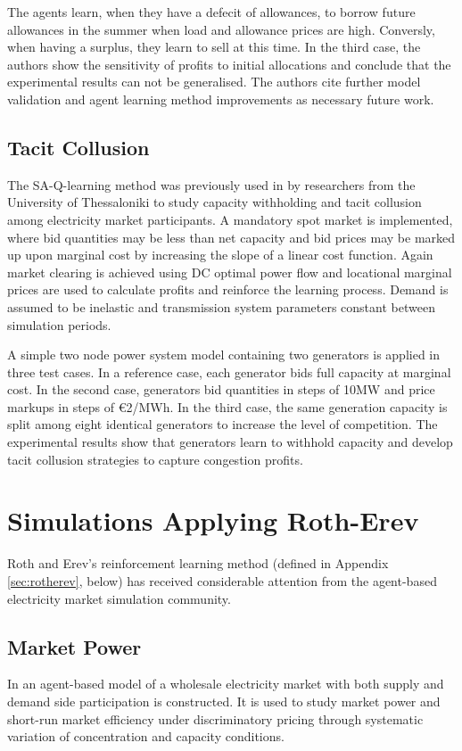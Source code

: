 The agents learn, when they have a defecit of allowances, to borrow future
allowances in the summer when load and allowance prices are high.  Conversly,
when having a surplus, they learn to sell at this time.  In the third case, the
authors show the sensitivity of profits to initial allocations and conclude that the experimental results can
not be generalised.  The authors cite further model validation and agent
learning method improvements as necessary future work.

\subsection{Tacit Collusion}
The SA-Q-learning method was previously used in \cite{tellidou:tacit} by
researchers from the University of Thessaloniki to study capacity withholding
and tacit collusion among electricity market participants.  A mandatory spot
market is implemented, where bid quantities may be less than net capacity and
bid prices may be marked up upon marginal cost by increasing the slope of a
linear cost function.  Again market clearing is achieved using DC optimal
power flow and locational marginal prices are used to calculate profits and
reinforce the learning process.  Demand is assumed to be inelastic and
transmission system parameters constant between simulation periods.

A simple two node power system model containing two generators is applied in
three test cases. In a reference case, each generator bids full capacity at
marginal cost.  In the second case, generators bid quantities in steps of 10MW
and price markups in steps of \euro{2}/MWh.  In the third case, the same
generation capacity is split among eight identical generators to increase the
level of competition. The experimental results show that generators learn to
withhold capacity and develop tacit collusion strategies to capture
congestion profits.

\section{Simulations Applying Roth-Erev}
Roth and Erev's reinforcement learning method (defined in Appendix
\ref{sec:rotherev}, below) has received considerable attention from the
agent-based electricity market simulation community.

\subsection{Market Power}
In \cite{nicolaisen:2001} an agent-based model of a wholesale electricity market
with both supply and demand side participation is constructed.  It is used to
study market power and short-run market efficiency under discriminatory pricing
through systematic variation of concentration and capacity conditions.


